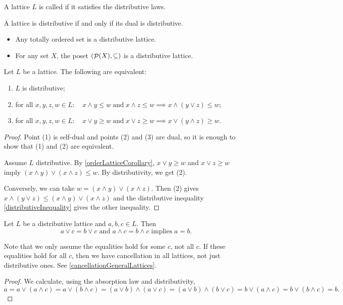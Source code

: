 \begin{definition}
A lattice $L$ is called  if it satisfies the distributive laws.
\end{definition}

\begin{lemma}
A lattice is distributive \textup{if and only if} its dual is distributive.
\end{lemma}

\begin{example}
\begin{itemize}
\item Any totally ordered set is a distributive lattice.
\item For any set $X$, the poset $\left( \mathop{\mathcal{P}}(X), \subseteq \right)$ is a distributive lattice.
\end{itemize}
\end{example}

\begin{lemma}
Let $L$ be a lattice. The following are equivalent:
\begin{enumerate}
\item $L$ is distributive;
\item for all $x,y,z,w\in L: \quad x\wedge y \leq w \;\text{and}\; x\wedge z\leq w \implies x\wedge (y\vee z) \leq w;$
\item for all $x,y,z,w\in L: \quad x\vee y \geq w \;\text{and}\; x\vee z\geq w \implies x\vee (y\wedge z) \geq w$.
\end{enumerate}
\end{lemma}
\begin{proof}
Point (1) is self-dual and points (2) and (3) are dual, so it is enough to show that (1) and (2) are equivalent.

Assume $L$ distributive. By \ref{orderLatticeCorollary}, $ x\vee y \geq w$ and $x\vee z\geq w$ imply $(x\wedge y)\vee (x\wedge z) \leq w$. By distributivity, we get (2).

Conversely, we can take $w = (x\wedge y)\vee (x\wedge z)$. Then (2) gives $x\wedge (y\vee z) \leq (x\wedge y)\vee (x\wedge z)$ and the distributive inequality \ref{distributiveInequality} gives the other inequality. 
\end{proof}

\begin{proposition} \label{cancellationDistributiveLattices}
Let $L$ be a distributive lattice and $a,b,c\in L$. Then
\[ \text{$a\vee c = b \vee c$ and $a\wedge c = b \wedge c$ implies $a = b$.} \]
\end{proposition}
Note that we only assume the equalities hold for some $c$, not all $c$. If these equalities hold for all $c$, then we have cancellation in all lattices, not just distributive ones. See \ref{cancellationGeneralLattices}.
\begin{proof}
We calculate, using the absorption law and distributivity,
\[ a = a\vee (a\wedge c) = a \vee (b\wedge c) = (a\vee b)\wedge (a\vee c) = (a\vee b) \wedge (b\vee c) = b \vee (a \wedge c) = b \vee (b\wedge c) = b. \]
\end{proof}

